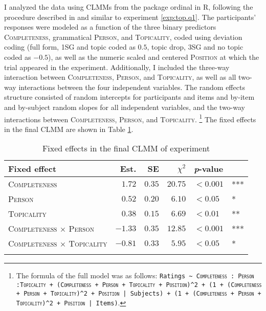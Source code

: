 I analyzed the data using CLMMs from the package ordinal \citep{christensen2019} in R, following the procedure described in  and similar to experiment \ref*{exp:top.q1}.
The participants' responses were modeled as a function of the three binary predictors \textsc{Completeness}, grammatical \textsc{Person}, and \textsc{Topicality}, coded using deviation coding (full form, 1SG and topic coded as $0.5$, topic drop, 3SG and no topic coded as $-0.5$), as well as the numeric scaled and centered \textsc{Position} at which the trial appeared in the experiment.
Additionally, I included the three-way interaction between \textsc{Completeness}, \textsc{Person}, and \textsc{Topicality}, as well as all two-way interactions between the four independent variables.
The random effects structure consisted of random intercepts for participants and items and by-item and by-subject random slopes for all independent variables, and the two-way interactions between \textsc{Completeness}, \textsc{Person}, and \textsc{Topicality}.%
\footnote{The formula of the full model was as follows: \texttt{Ratings \textasciitilde ~\textsc{Completeness} : \textsc{Person} :\textsc{Topicality} + (\textsc{Completeness} + \textsc{Person} + \textsc{Topicality} + \textsc{Position})\textasciicircum2 + 
(1 + (\textsc{Completeness} + \textsc{Person} + \textsc{Topicality})\textasciicircum2 + \textsc{Position} | Subjects) + 
(1 + (\textsc{Completeness} + \textsc{Person} + \textsc{Topicality})\textasciicircum2 + \textsc{Position} | Items)}.}
%
The fixed effects in the final CLMM are shown in Table \ref{tab:model.exp.top.fv}.

\begin{table}
\caption{Fixed effects in the final CLMM of experiment }
\centering
\begin{tabular}{lrrrll}
\lsptoprule
Fixed effect & Est. & SE & $\chi^2$ & \textit{p}-value &   \\
\midrule
\textsc{Completeness} & $1.72$ & $0.35$ & $20.75$ & $< 0.001$ & ***\\
\textsc{Person} & $0.52$ & $0.20$ & $6.10$ & $< 0.05$ & *\\
\textsc{Topicality} & $0.38$ & $0.15$ & $6.69$ & $< 0.01$ & ** \\
\textsc{Completeness $\times$ Person} & $-1.33$ & $0.35$ & $12.85$ & $< 0.001$ & ***\\
\textsc{Completeness $\times$ Topicality} & $-0.81$ & $0.33$ & $5.95$ & $< 0.05$ & *\\
\lspbottomrule
\end{tabular}
\label{tab:model.exp.top.fv}
\end{table}

